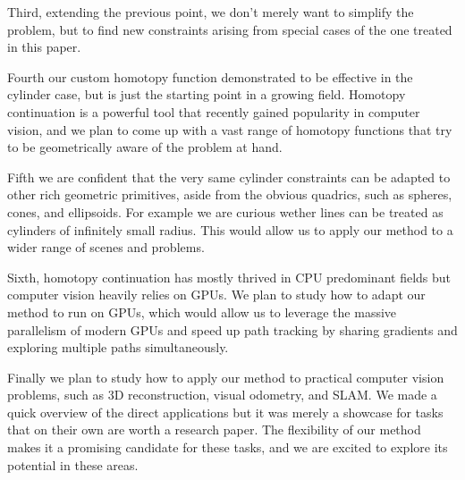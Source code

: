 Third, extending the previous point, we don't merely want to simplify the problem, but to find new constraints arising from special cases of the one treated in this paper.

Fourth our custom homotopy function demonstrated to be effective in the cylinder case, but is just the starting point in a growing field. Homotopy continuation is a powerful tool that recently gained popularity in computer vision, and we plan to come up with a vast range of homotopy functions that try to be geometrically aware of the problem at hand.

Fifth we are confident that the very same cylinder constraints can be adapted to other rich geometric primitives, aside from the obvious quadrics, such as spheres, cones, and ellipsoids. For example we are curious wether lines can be treated as cylinders of infinitely small radius. This would allow us to apply our method to a wider range of scenes and problems.

Sixth, homotopy continuation has mostly thrived in CPU predominant fields but computer vision heavily relies on GPUs. We plan to study how to adapt our method to run on GPUs, which would allow us to leverage the massive parallelism of modern GPUs and speed up path tracking by sharing gradients and exploring multiple paths simultaneously.

Finally we plan to study how to apply our method to practical computer vision problems, such as 3D reconstruction, visual odometry, and SLAM. We made a quick overview of the direct applications but it was merely a showcase for tasks that on their own are worth a research paper. The flexibility of our method makes it a promising candidate for these tasks, and we are excited to explore its potential in these areas.
